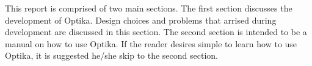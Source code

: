 This report is comprised of two main sections. The first section discusses the development
of Optika. Design choices and problems that arrised during development are
discussed in this section. The second section is intended to be a manual on how to use
Optika. If the reader desires simple to learn how to use Optika, it is suggested he/she
skip to the second section.
